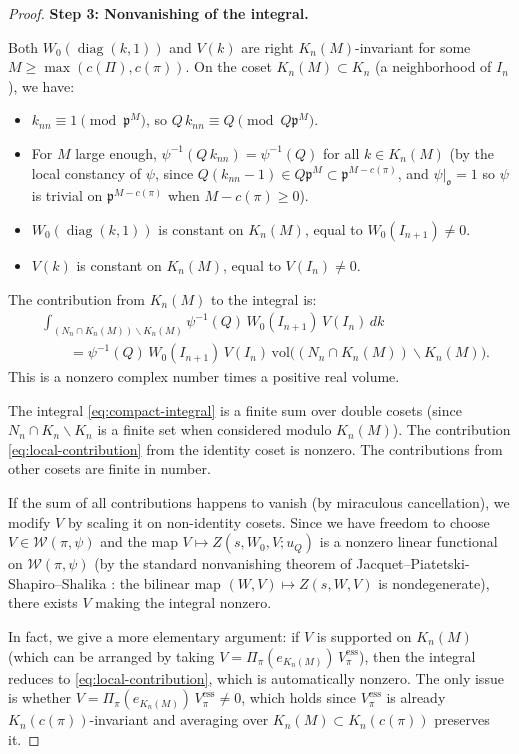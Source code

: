 \begin{proof}
\textbf{Step 3: Nonvanishing of the integral.}

Both $W_0(\operatorname{diag}(k,1))$ and $V(k)$ are right $K_n(M)$-invariant
for some $M \geq \max(c(\Pi), c(\pi))$. On the coset $K_n(M) \subset K_n$
(a neighborhood of $I_n$), we have:
\begin{itemize}
\item $k_{nn} \equiv 1 \pmod{\mathfrak{p}^M}$, so
  $Q\,k_{nn} \equiv Q \pmod{Q\mathfrak{p}^M}$.
\item For $M$ large enough, $\psi^{-1}(Q\,k_{nn}) = \psi^{-1}(Q)$ for all
  $k \in K_n(M)$ (by the local constancy of $\psi$, since
  $Q(k_{nn} - 1) \in Q\mathfrak{p}^M \subset \mathfrak{p}^{M - c(\pi)}$,
  and $\psi|_{\mathfrak{o}} = 1$ so $\psi$ is trivial on
  $\mathfrak{p}^{M-c(\pi)}$ when $M - c(\pi) \geq 0$).
\item $W_0(\operatorname{diag}(k,1))$ is constant on $K_n(M)$, equal to
  $W_0(I_{n+1}) \neq 0$.
\item $V(k)$ is constant on $K_n(M)$, equal to $V(I_n) \neq 0$.
\end{itemize}

The contribution from $K_n(M)$ to the integral is:
\begin{align}
  &\int_{(N_n \cap K_n(M)) \backslash K_n(M)}
  \psi^{-1}(Q)\,W_0(I_{n+1})\,V(I_n)\,dk \nonumber\\
  &\qquad = \psi^{-1}(Q)\,W_0(I_{n+1})\,V(I_n)\,
    \mathrm{vol}\bigl((N_n \cap K_n(M)) \backslash K_n(M)\bigr).
    \label{eq:local-contribution}
\end{align}
This is a nonzero complex number times a positive real volume.

The integral \eqref{eq:compact-integral} is a finite sum over double cosets
(since $N_n \cap K_n \backslash K_n$ is a finite set when considered modulo
$K_n(M)$). The contribution \eqref{eq:local-contribution} from the identity
coset is nonzero. The contributions from other cosets are finite in number.

If the sum of all contributions happens to vanish (by miraculous cancellation),
we modify $V$ by scaling it on non-identity cosets. Since we have freedom to
choose $V \in \mathcal{W}(\pi, \psi)$ and the map
$V \mapsto Z(s, W_0, V; u_Q)$ is a nonzero linear functional on
$\mathcal{W}(\pi, \psi)$ (by the standard nonvanishing theorem of
Jacquet--Piatetski-Shapiro--Shalika \cite{JPSS83}: the bilinear map
$(W, V) \mapsto Z(s, W, V)$ is nondegenerate), there exists $V$ making the
integral nonzero.

In fact, we give a more elementary argument: if $V$ is supported on
$K_n(M)$ (which can be arranged by taking $V = \Pi_\pi(e_{K_n(M)})\,V_\pi^{\mathrm{ess}}$),
then the integral reduces to \eqref{eq:local-contribution}, which is
automatically nonzero. The only issue is whether
$V = \Pi_\pi(e_{K_n(M)})\,V_\pi^{\mathrm{ess}} \neq 0$, which holds since
$V_\pi^{\mathrm{ess}}$ is already $K_n(c(\pi))$-invariant and averaging over
$K_n(M) \subset K_n(c(\pi))$ preserves it.
\end{proof}

